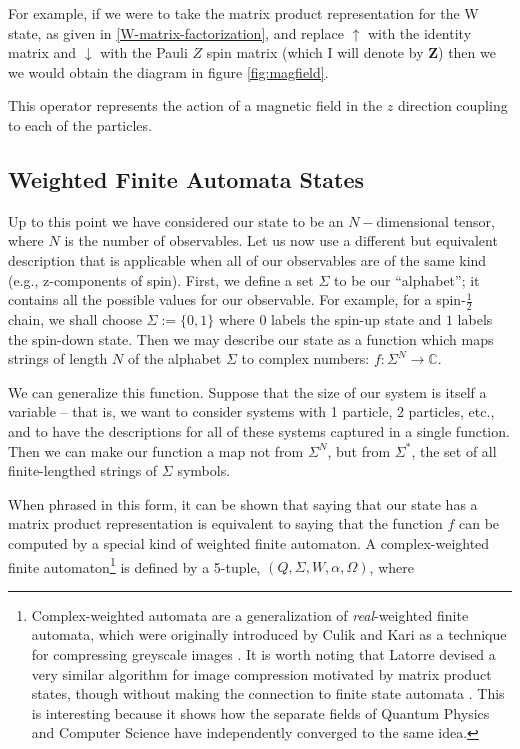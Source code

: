 \documentclass[12pt]{amsbook}
\theoremstyle{plain}
\theoremstyle{definition}
\theoremstyle{remark}
\newcommand{\half}{\frac{1}{2}}
\begin{document}
For example, if we were to take the matrix product representation for the W state, as given in \eqref{W-matrix-factorization}, and replace $\uparrow$ with the identity matrix and $\downarrow$ with the Pauli $Z$ spin matrix (which I will denote by \textbf{Z}) then we we would obtain the diagram in figure \ref{fig:magfield}.

This operator represents the action of a magnetic field in the $z$ direction coupling to each of the particles.
\subsection{Weighted Finite Automata States}

Up to this point we have considered our state to be an $N-$dimensional tensor, where $N$ is the number of observables.  Let us now use a different but equivalent description that is applicable when all of our observables are of the same kind (e.g., z-components of spin).  First, we define a set $\Sigma$ to be our ``alphabet'';  it contains all the possible values for our observable.  For example, for a spin-$\half$ chain, we shall choose $\Sigma:=\{0,1\}$ where $0$ labels the spin-up state and $1$ labels the spin-down state.  Then we may describe our state as a function which maps strings of length $N$ of the alphabet $\Sigma$ to complex numbers:  $f: \Sigma^N\to \mathbb{C}$.

We can generalize this function.  Suppose that the size of our system is itself a variable -- that is, we want to consider systems with 1 particle, 2 particles, etc., and to have the descriptions for all of these systems captured in a single function.  Then we can make our function a map not from $\Sigma^N$, but from $\Sigma^*$, the set of all finite-lengthed strings of $\Sigma$ symbols.

When phrased in this form, it can be shown that saying that our state has a matrix product representation is equivalent to saying that the function $f$ can be computed by a special kind of weighted finite automaton.  A complex-weighted finite automaton\footnote{Complex-weighted automata are a generalization of \textit{real}-weighted finite automata, which were originally introduced by Culik and Kari as a technique for compressing greyscale images \cite{II:1993fk} \cite{II:fk} \cite{Jiang:2003wd}.  It is worth noting that Latorre devised a very similar algorithm for image compression motivated by matrix product states, though without making the connection to finite state automata \cite{quant-ph/0510031}.  This is interesting because it shows how the separate fields of Quantum Physics and Computer Science have independently converged to the same idea.} is defined by a 5-tuple, $(Q,\Sigma,W,\alpha,\Omega)$, where
\end{document}
